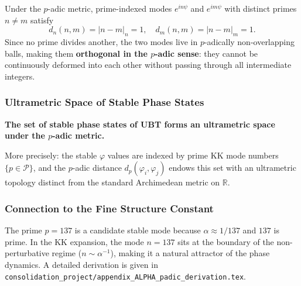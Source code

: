 Under the $p$-adic metric, prime-indexed modes $e^{in\psi}$ and $e^{im\psi}$ with distinct primes
$n \neq m$ satisfy
\begin{equation}
d_n(n, m) = |n - m|_n = 1,\quad d_m(n, m) = |n - m|_m = 1.
\end{equation}
Since no prime divides another, the two modes live in $p$-adically non-overlapping
balls, making them \textbf{orthogonal in the $p$-adic sense}: they cannot be continuously
deformed into each other without passing through all intermediate integers.

\subsubsection{Ultrametric Space of Stable Phase States}

\begin{tcolorbox}[colback=green!5!white,colframe=green!75!black,title=Theorem: Ultrametric Phase Space]
\textbf{The set of stable phase states of UBT forms an ultrametric space under the $p$-adic metric.}

More precisely: the stable $\varphi$ values are indexed by prime KK mode numbers
$\{p \in \mathcal{P}\}$, and the $p$-adic distance $d_p(\varphi_i, \varphi_j)$ endows this
set with an ultrametric topology distinct from the standard Archimedean metric on $\mathbb{R}$.
\end{tcolorbox}

\subsubsection{Connection to the Fine Structure Constant}

The prime $p = 137$ is a candidate stable mode because $\alpha \approx 1/137$ and $137$ is prime.
In the KK expansion, the mode $n = 137$ sits at the boundary of the non-perturbative regime
($n \sim \alpha^{-1}$), making it a natural attractor of the phase dynamics.  A detailed derivation
is given in \texttt{consolidation\_project/appendix\_ALPHA\_padic\_derivation.tex}.

